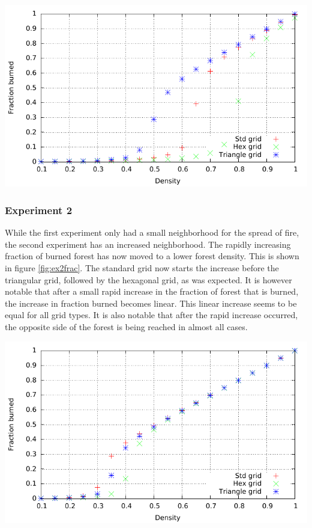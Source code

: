 \documentclass{article}
\newenvironment{Figure}
  {\par\medskip\noindent\minipage{\linewidth}}
  {\endminipage\par\medskip}
\begin{document}
\begin{multicols}{2}
\begin{Figure}
 \centering
 \includegraphics[width=\textwidth]{imgs/plot/ex1/fracburned.pdf}
\label{fig:ex1frac}
\end{Figure}
\subsubsection*{Experiment 2}
While the first experiment only had a small neighborhood for the spread of fire, the second experiment has an increased neighborhood. The rapidly increasing fraction of burned forest has now moved to a lower forest density. This is shown in figure \ref{fig:ex2frac}. The standard grid now starts the increase before the triangular grid, followed by the hexagonal grid, as was expected. It is however notable that after a small rapid increase in the fraction of forest that is burned, the increase in fraction burned becomes linear. This linear increase seems to be equal for all grid types. It is also notable that after the rapid increase occurred, the opposite side of the forest is being reached in almost all cases.

\begin{Figure}
 \centering
 \includegraphics[width=\textwidth]{imgs/plot/ex2/fracburned.pdf}
\label{fig:ex2frac}
\end{Figure}

\end{multicols}
\end{document}
